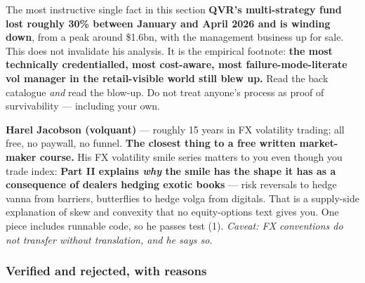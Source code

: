 \documentclass[11pt,a4paper]{article}
\begin{document}
\begin{keyfact}{The most instructive single fact in this section}
\textbf{QVR's multi-strategy fund lost roughly 30\% between January and April 2026
and is winding down}, from a peak around \$1.6bn, with the management business up
for sale. This does not invalidate his analysis. It is the empirical footnote:
\textbf{the most technically credentialled, most cost-aware, most
failure-mode-literate vol manager in the retail-visible world still blew up.} Read
the back catalogue \emph{and} read the blow-up. Do not treat anyone's process as
proof of survivability --- including your own.
\end{keyfact}

\textbf{Harel Jacobson (volquant)} --- roughly 15 years in FX volatility trading;
all free, no paywall, no funnel. \textbf{The closest thing to a free written
market-maker course.} His FX volatility smile series matters to you even though you
trade index: \textbf{Part II explains \emph{why} the smile has the shape it has as
a consequence of dealers hedging exotic books} --- risk reversals to hedge vanna
from barriers, butterflies to hedge volga from digitals. That is a supply-side
explanation of skew and convexity that no equity-options text gives you. One piece
includes runnable code, so he passes test (1). \emph{Caveat: FX conventions do not
transfer without translation, and he says so.}

\subsubsection{Verified and rejected, with reasons}
\end{document}
